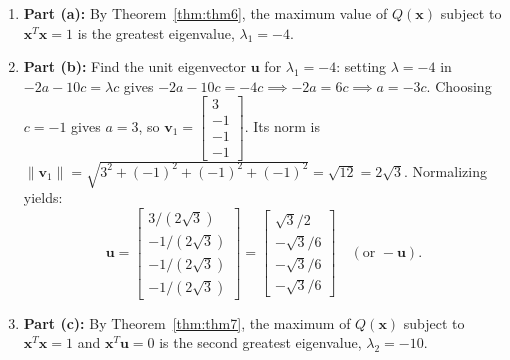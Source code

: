 \documentclass[11pt, letterpaper]{article}
\theoremstyle{definition}
\theoremstyle{remark}
\begin{document}
\begin{enumerate}[leftmargin=2em]
\begin{itemize}
        \item \emph{Restriction to $b = c$:} The remaining two eigenvectors have the form $\mathbf{v} = (a, c, c, c)^T$, reducing the system to a $2 \times 2$ eigenproblem:
        \[
        \begin{bmatrix} -6 & -6 \\ -2 & -10 \end{bmatrix} \begin{bmatrix} a \\ c \end{bmatrix} = \lambda \begin{bmatrix} a \\ c \end{bmatrix}.
        \]
        Its characteristic equation is:
        \[
        (-6 - \lambda)(-10 - \lambda) - (-6)(-2) = (\lambda + 6)(\lambda + 10) - 12 = \lambda^2 + 16\lambda + 48 = (\lambda + 4)(\lambda + 12) = 0,
        \]
        yielding $\lambda = -4$ and $\lambda = -12$.
    \end{itemize}
    Ordering all four eigenvalues in the \textbf{natural real ordering}:
    \[
    \lambda_1 = -4 > \lambda_2 = -10 > \lambda_3 = -12 > \lambda_4 = -16.
    \]
    (Trace check: $-4 + (-10) + (-12) + (-16) = -42 = -6 - 10 - 13 - 13 = \operatorname{tr}(A)$.)
    \item \textbf{Part (a):} By Theorem~\ref{thm:thm6}, the maximum value of $Q(\mathbf{x})$ subject to $\mathbf{x}^T \mathbf{x} = 1$ is the greatest eigenvalue, $\lambda_1 = -4$.
    \item \textbf{Part (b):} Find the unit eigenvector $\mathbf{u}$ for $\lambda_1 = -4$: setting $\lambda = -4$ in $-2a - 10c = \lambda c$ gives $-2a - 10c = -4c \implies -2a = 6c \implies a = -3c$. Choosing $c = -1$ gives $a = 3$, so $\mathbf{v}_1 = \begin{bmatrix} 3 \\ -1 \\ -1 \\ -1 \end{bmatrix}$. Its norm is $\|\mathbf{v}_1\| = \sqrt{3^2 + (-1)^2 + (-1)^2 + (-1)^2} = \sqrt{12} = 2\sqrt{3}$. Normalizing yields:
    \[
    \mathbf{u} = \begin{bmatrix} 3/(2\sqrt{3}) \\ -1/(2\sqrt{3}) \\ -1/(2\sqrt{3}) \\ -1/(2\sqrt{3}) \end{bmatrix} = \begin{bmatrix} \sqrt{3}/2 \\ -\sqrt{3}/6 \\ -\sqrt{3}/6 \\ -\sqrt{3}/6 \end{bmatrix} \quad \left(\text{or } -\mathbf{u}\right).
    \]
    \item \textbf{Part (c):} By Theorem~\ref{thm:thm7}, the maximum of $Q(\mathbf{x})$ subject to $\mathbf{x}^T \mathbf{x} = 1$ and $\mathbf{x}^T \mathbf{u} = 0$ is the second greatest eigenvalue, $\lambda_2 = -10$.
\end{enumerate}
\end{document}
